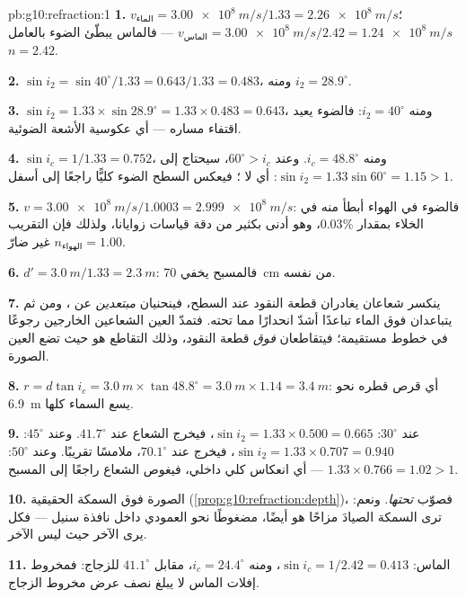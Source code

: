 \begin{solution}{pb:g10:refraction:1}
\textbf{1.} $v_{\text{الماء}} = \qty{3.00e8}{m/s}/1.33 =
\qty{2.26e8}{m/s}$؛ $v_{\text{الماس}} = \qty{3.00e8}{m/s}/2.42 =
\qty{1.24e8}{m/s}$ --- فالماس يبطّئ الضوء بالعامل $n = 2.42$.

\textbf{2.} $\sin i_2 = \sin 40^\circ / 1.33 = 0.643/1.33 = 0.483$، ومنه
$i_2 = 28.9^\circ$.

\textbf{3.} $\sin i_2 = 1.33 \times \sin 28.9^\circ = 1.33 \times
0.483 = 0.643$، ومنه $i_2 = 40^\circ$: فالضوء يعيد اقتفاء مساره ---
أي عكوسية الأشعة الضوئية.

\textbf{4.} $\sin i_c = 1/1.33 = 0.752$، ومنه $i_c = 48.8^\circ$. وعند
$60^\circ > i_c$، سيحتاج  إلى $\sin i_2 = 1.33 \sin
60^\circ = 1.15 > 1$: أي لا ؛ فيعكس السطح
الضوء كليًّا راجعًا إلى أسفل.

\textbf{5.} $v = \qty{3.00e8}{m/s}/1.0003 = \qty{2.999e8}{m/s}$: فالضوء
في الهواء أبطأ منه في الخلاء بمقدار $0.03\%$، وهو أدنى بكثير من دقة
قياسات زوايانا، ولذلك فإن التقريب $n_{\text{الهواء}} = 1.00$ غير ضارّ.

\textbf{6.} $d' = \qty{3.0}{m}/1.33 = \qty{2.3}{m}$: فالمسبح يخفي
\qty{70}{cm} من نفسه.

\textbf{7.} ينكسر شعاعان يغادران قطعة النقود عند السطح، فينحنيان
\emph{مبتعدين} عن ، ومن ثم يتباعدان فوق الماء تباعدًا أشدّ
انحدارًا مما تحته. فتمدّ العين الشعاعين الخارجين رجوعًا في
خطوط مستقيمة؛ فيتقاطعان \emph{فوق} قطعة النقود، وذلك التقاطع هو
حيث تضع العين الصورة.

\textbf{8.} $r = d \tan i_c = \qty{3.0}{m} \times \tan 48.8^\circ =
\qty{3.0}{m} \times 1.14 = \qty{3.4}{m}$: أي قرص قطره نحو \qty{6.9}{m}
يسع السماء كلها.

\textbf{9.} عند $30^\circ$: $\sin i_2 = 1.33 \times 0.500 = 0.665$، فيخرج
الشعاع عند $41.7^\circ$. وعند $45^\circ$: $\sin i_2 = 1.33 \times
0.707 = 0.940$، فيخرج عند $70.1^\circ$، ملامسًا تقريبًا. وعند
$50^\circ$: $1.33 \times 0.766 = 1.02 > 1$ --- أي انعكاس كلي
داخلي، فيغوص الشعاع راجعًا إلى المسبح.

\textbf{10.} الصورة فوق السمكة الحقيقية
(\cref{prop:g10:refraction:depth})، فصوّب \emph{تحتها}. ونعم:
ترى السمكة الصيادَ مزاحًا هو أيضًا، مضغوطًا نحو العمودي
داخل نافذة سنيل --- فكل يرى الآخر حيث ليس الآخر.

\textbf{11.} الماس: $\sin i_c = 1/2.42 = 0.413$، ومنه
$i_c = 24.4^\circ$، مقابل $41.1^\circ$ للزجاج: فمخروط إفلات الماس
لا يبلغ نصف عرض مخروط الزجاج.


\end{solution}
